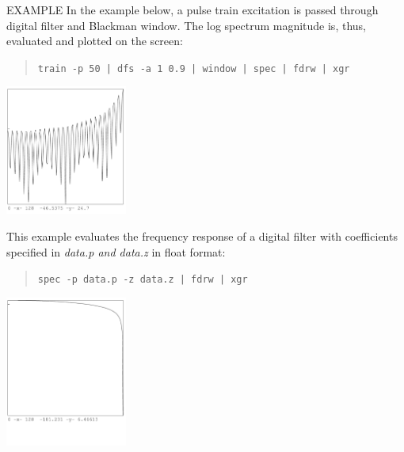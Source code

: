 \begin{qsection}{EXAMPLE}
In the example below, a pulse train excitation is passed
through digital filter and Blackman window.
The log spectrum magnitude is, thus, evaluated and plotted
on the screen:
\begin{quote}
  \verb!train -p 50 | dfs -a 1 0.9 | window | spec | fdrw | xgr !
\end{quote}
\begin{center}
\includegraphics[width=4cm]{fig/spec_1.pdf}
\end{center}
\par
This example evaluates the frequency response of
a digital filter with coefficients specified in {\em data.p and data.z}
in float format:
\begin{quote}
  \verb!spec -p data.p -z data.z | fdrw | xgr !
\end{quote}
\begin{center}
\includegraphics[width=4cm]{fig/spec_2.pdf}
\end{center}


\end{qsection}
